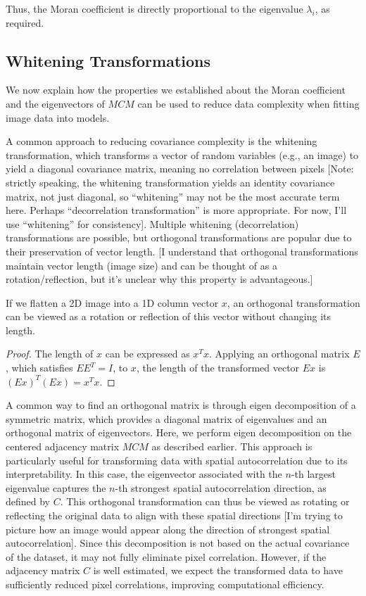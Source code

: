 \documentclass[12pt]{article}
\begin{document}
Thus, the Moran coefficient is directly proportional to the eigenvalue \( \lambda_i \), as required.

\subsection*{Whitening Transformations}

We now explain how the properties we established about the Moran coefficient and the eigenvectors of \( M C M \) can be used to reduce data complexity when fitting image data into models.

A common approach to reducing covariance complexity is the whitening transformation, which transforms a vector of random variables (e.g., an image) to yield a diagonal covariance matrix, meaning no correlation between pixels [Note: strictly speaking, the whitening transformation yields an identity covariance matrix, not just diagonal, so ``whitening'' may not be the most accurate term here. Perhaps ``decorrelation transformation'' is more appropriate. For now, I'll use ``whitening'' for consistency]. Multiple whitening (decorrelation) transformations are possible, but orthogonal transformations are popular due to their preservation of vector length. [I understand that orthogonal transformations maintain vector length (image size) and can be thought of as a rotation/reflection, but it’s unclear why this property is advantageous.]

If we flatten a 2D image into a 1D column vector \( x \), an orthogonal transformation can be viewed as a rotation or reflection of this vector without changing its length.
\begin{proof}
  The length of \( x \) can be expressed as \( x^T x \). Applying an orthogonal matrix \( E \), which satisfies \( E E^T = I \), to \( x \), the length of the transformed vector \( E x \) is \( (E x)^T (E x) = x^T x \).
\end{proof}

A common way to find an orthogonal matrix is through eigen decomposition of a symmetric matrix, which provides a diagonal matrix of eigenvalues and an orthogonal matrix of eigenvectors. Here, we perform eigen decomposition on the centered adjacency matrix \( M C M \) as described earlier. This approach is particularly useful for transforming data with spatial autocorrelation due to its interpretability. In this case, the eigenvector associated with the \( n \)-th largest eigenvalue captures the \( n \)-th strongest spatial autocorrelation direction, as defined by \( C \). This orthogonal transformation can thus be viewed as rotating or reflecting the original data to align with these spatial directions [I'm trying to picture how an image would appear along the direction of strongest spatial autocorrelation]. Since this decomposition is not based on the actual covariance of the dataset, it may not fully eliminate pixel correlation. However, if the adjacency matrix \( C \) is well estimated, we expect the transformed data to have sufficiently reduced pixel correlations, improving computational efficiency.
\end{document}
